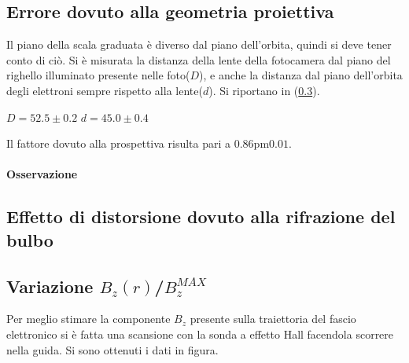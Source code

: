 \documentclass[10pt,a4paper]{article}
\begin{document}
\subsection{Errore dovuto alla geometria proiettiva}
Il piano della scala graduata è diverso dal piano dell'orbita, quindi si deve tener conto di ciò. Si è misurata la distanza della lente della fotocamera dal piano del righello illuminato presente nelle foto($D$), e anche la distanza dal piano dell'orbita degli elettroni sempre rispetto alla lente($d$).
Si riportano in \tablename(\ref{}).

$D = 52.5 \pm 0.2$
$d = 45.0 \pm 0.4$

Il fattore dovuto alla prospettiva risulta pari a $\unit{0.86 \pm 0.01}{}$. 

\paragraph{Osservazione}

\subsection{Effetto di distorsione dovuto alla rifrazione del bulbo}

\subsection{Variazione $B_z(r)$/$B_z^{MAX}$}

Per meglio stimare la componente $B_z$ presente sulla traiettoria del fascio elettronico si è fatta una scansione con la sonda a effetto Hall facendola scorrere nella guida. Si sono ottenuti i dati in figura.\\

\end{document}

